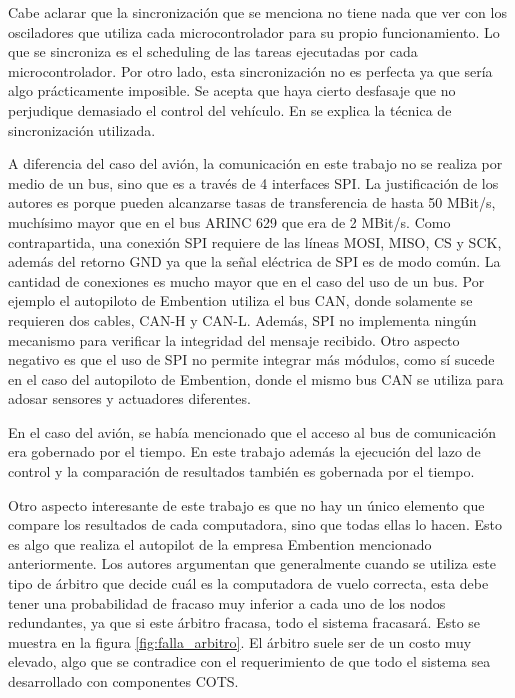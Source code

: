 Cabe aclarar que la sincronización que se menciona no tiene nada que ver con los osciladores que utiliza cada microcontrolador para su propio funcionamiento. Lo que se sincroniza es el scheduling de las tareas ejecutadas por cada microcontrolador. Por otro lado, esta sincronización no es perfecta ya que sería algo prácticamente imposible. Se acepta que haya cierto desfasaje que no perjudique demasiado el control del vehículo. En \cite{hiergeist2018implementation} se explica la técnica de sincronización utilizada.

A diferencia del caso del avión, la comunicación en este trabajo no se realiza por medio de un bus, sino que es a través de 4 interfaces SPI. La justificación de los autores es porque pueden alcanzarse tasas de transferencia de hasta 50 MBit/s, muchísimo mayor que en el bus ARINC 629 que era de 2 MBit/s. Como contrapartida, una conexión SPI requiere de las líneas MOSI, MISO, CS y SCK, además del retorno GND ya que la señal eléctrica de SPI es de modo común. La cantidad de conexiones es mucho mayor que en el caso del uso de un bus. Por ejemplo el autopiloto de Embention utiliza el bus CAN, donde solamente se requieren dos cables, CAN-H y CAN-L. Además, SPI no implementa ningún mecanismo para verificar la integridad del mensaje recibido. Otro aspecto negativo es que el uso de SPI no permite integrar más módulos, como sí sucede en el caso del autopiloto de Embention, donde el mismo bus CAN se utiliza para adosar sensores y actuadores diferentes.

En el caso del avión, se había mencionado que el acceso al bus de comunicación era gobernado por el tiempo. En este trabajo además la ejecución del lazo de control y la comparación de resultados también es gobernada por el tiempo.

Otro aspecto interesante de este trabajo es que no hay un único elemento que compare los resultados de cada computadora, sino que todas ellas lo hacen. Esto es algo que realiza el autopilot de la empresa Embention mencionado anteriormente. Los autores argumentan que generalmente cuando se utiliza este tipo de árbitro que decide cuál es la computadora de vuelo correcta, esta debe tener una probabilidad de fracaso muy inferior a cada uno de los nodos redundantes, ya que si este árbitro fracasa, todo el sistema fracasará. Esto se muestra en la figura \ref{fig:falla_arbitro}. El árbitro suele ser de un costo muy elevado, algo que se contradice con el requerimiento de que todo el sistema sea desarrollado con componentes COTS.

